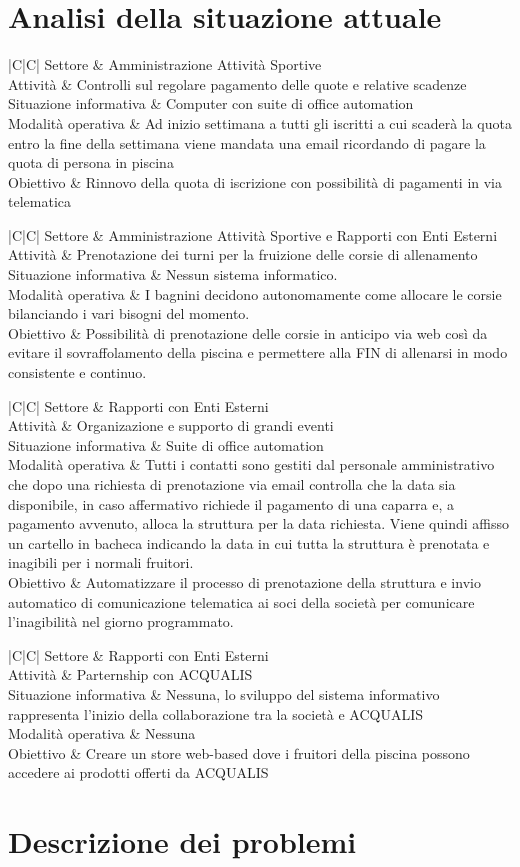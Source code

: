 \documentclass[11pt]{article} %
\newcommand{\AnalisiSituazioneAttualeTabella}[5]{
	\begin{tabulary}{\textwidth}{|C|C|}
		\hline
		Settore & #1 \\ \hline
		Attività & #2 \\ \hline
		Situazione informativa & #3 \\ \hline
		Modalità operativa & #4 \\ \hline
		Obiettivo & #5 \\ \hline
	\end{tabulary}
}
\begin{document}
\section{Analisi della situazione attuale}

\AnalisiSituazioneAttualeTabella
	{Amministrazione Attività Sportive}
	{Controlli sul regolare pagamento delle quote e relative scadenze}
	{Computer con suite di office automation}
	{Ad inizio settimana a tutti gli iscritti a cui scaderà la quota entro la fine della settimana viene mandata una email ricordando di pagare la quota di persona in piscina}
	{Rinnovo della quota di iscrizione con possibilità di pagamenti in via telematica}

\AnalisiSituazioneAttualeTabella
	{Amministrazione Attività Sportive e Rapporti con Enti Esterni}
	{Prenotazione dei turni per la fruizione delle corsie di allenamento}
	{Nessun sistema informatico.}
	{I bagnini decidono autonomamente come allocare le corsie bilanciando i vari bisogni del momento.}
	{Possibilità di prenotazione delle corsie in anticipo via web così da evitare il sovraffolamento della piscina e permettere alla FIN di allenarsi in modo consistente e continuo.}

\AnalisiSituazioneAttualeTabella
	{Rapporti con Enti Esterni}
	{Organizazione e supporto di grandi eventi}
	{Suite di office automation}
	{Tutti i contatti sono gestiti dal personale amministrativo che dopo una richiesta di prenotazione via email controlla che la data sia disponibile, in caso affermativo richiede il pagamento di una caparra e, a pagamento avvenuto, alloca la struttura per la data richiesta. Viene quindi affisso un cartello in bacheca indicando la data in cui tutta la struttura è prenotata e inagibili per i normali fruitori.}
	{Automatizzare il processo di prenotazione della struttura e invio automatico di comunicazione telematica ai soci della società per comunicare l'inagibilità nel giorno programmato.}

\AnalisiSituazioneAttualeTabella
	{Rapporti con Enti Esterni}
	{Parternship con ACQUALIS}
	{Nessuna, lo sviluppo del sistema informativo rappresenta l'inizio della collaborazione tra la società e ACQUALIS}
	{Nessuna}
	{Creare un store web-based dove i fruitori della piscina possono accedere ai prodotti offerti da ACQUALIS}

\section{Descrizione dei problemi}
\end{document}
